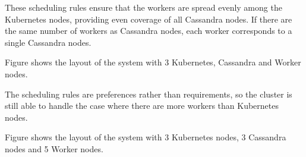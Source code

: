 These scheduling rules ensure that the workers are spread evenly among the Kubernetes nodes, providing even coverage of all Cassandra nodes. If there are the same number of workers as Cassandra nodes, each worker corresponds to a single Cassandra nodes.

Figure  shows the layout of the system with 3 Kubernetes, Cassandra and Worker nodes.


The scheduling rules are preferences rather than requirements, so the cluster is still able to handle the case where there are more workers than Kubernetes nodes.

Figure  shows the layout of the system with 3 Kubernetes nodes, 3 Cassandra nodes and 5 Worker nodes.


